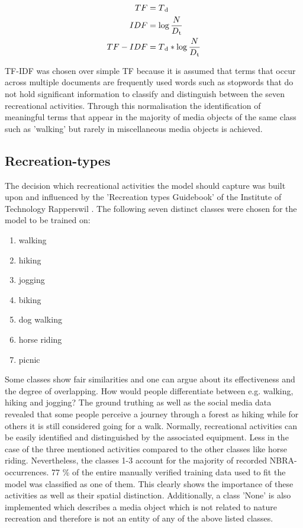 \begin{align}
TF &= T\textsubscript{d}\\
IDF &= \log\frac{N}{D\textsubscript{t}}\\
TF-IDF &= T\textsubscript{d} * \log\frac{N}{D\textsubscript{t}}
\end{align}

\newline
TF-IDF was chosen over simple TF because it is assumed that terms that occur across multiple documents are frequently used words such as stopwords that do not hold significant information to classify and distinguish between the seven recreational activities. Through this normalisation the identification of meaningful terms that appear in the majority of media objects of the same class such as 'walking' but rarely in miscellaneous media objects is achieved. 

\subsection{Recreation-types} \label{recreation_types}
The decision which recreational activities the model should capture was built upon and influenced by the 'Recreation types Guidebook' of the Institute of Technology Rapperswil \parencite{IFL2018}. The following seven distinct classes were chosen for the model to be trained on:

\begin{enumerate}
    \item walking
    \item hiking
    \item jogging
    \item biking
    \item dog walking
    \item horse riding
    \item picnic
\end{enumerate}

Some classes show fair similarities and one can argue about its effectiveness and the degree of overlapping. How would people differentiate between e.g. walking, hiking and jogging? The ground truthing as well as the social media data revealed that some people perceive a journey through a forest as hiking while for others it is still considered going for a walk. Normally, recreational activities can be easily identified and distinguished by the associated equipment. Less in the case of the three mentioned activities compared to the other classes like horse riding. Nevertheless, the classes 1-3 account for the majority of recorded NBRA-occurrences. 77 \% of the entire manually verified training data used to fit the model was classified as one of them. This clearly shows the importance of these activities as well as their spatial distinction. Additionally, a class 'None' is also implemented which describes a media object which is not related to nature recreation and therefore is not an entity of any of the above listed classes.\\

